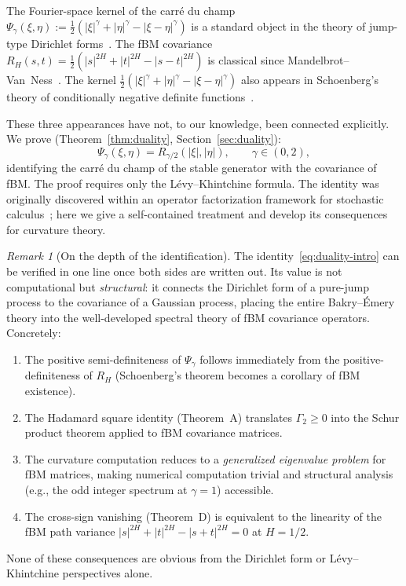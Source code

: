 \documentclass[11pt,a4paper]{article}
\theoremstyle{plain}
\theoremstyle{definition}
\theoremstyle{remark}
\newtheorem{remark}[theorem]{Remark}
\begin{document}
The Fourier-space kernel of the carr\'e du champ
$\Psi_\gamma(\xi,\eta) :=
\frac{1}{2}(|\xi|^\gamma + |\eta|^\gamma - |\xi-\eta|^\gamma)$
is a standard object in the theory of jump-type Dirichlet
forms~\cite{BoettcherSchillingWang2013}.
The fBM covariance $R_H(s,t) = \frac{1}{2}(|s|^{2H} + |t|^{2H}
- |s-t|^{2H})$ is classical since
Mandelbrot--Van~Ness~\cite{Mishura2008}.
The kernel $\frac{1}{2}(|\xi|^\gamma + |\eta|^\gamma
- |\xi-\eta|^\gamma)$ also appears in Schoenberg's
theory of conditionally negative definite
functions~\cite{Schoenberg1938}.

These three appearances have not, to our knowledge, been connected
explicitly.  We prove (Theorem~\ref{thm:duality},
Section~\ref{sec:duality}):
\begin{equation}\label{eq:duality-intro}
  \Psi_\gamma(\xi,\eta) = R_{\gamma/2}(|\xi|,|\eta|),
  \qquad \gamma \in (0,2),
\end{equation}
identifying the carr\'e du champ of the stable generator with
the covariance of fBM.  The proof requires only the
L\'evy--Khintchine formula.
The identity was originally discovered within an operator
factorization framework for stochastic
calculus~\cite{Fontes2026a}; here we give a self-contained
treatment and develop its consequences for curvature theory.

\begin{remark}[On the depth of the identification]
\label{rem:identification}
The identity~\eqref{eq:duality-intro} can be verified
in one line once both sides are written out. Its value
is not computational but \emph{structural}: it connects
the Dirichlet form of a pure-jump process to the
covariance of a Gaussian process, placing the entire
Bakry--\'Emery theory into the well-developed spectral
theory of fBM covariance operators. Concretely:
\begin{enumerate}[label=(\alph*)]
\item The positive semi-definiteness of $\Psi_\gamma$
  follows immediately from the positive-definiteness
  of $R_H$ (Schoenberg's theorem becomes a
  corollary of fBM existence).
\item The Hadamard square identity (Theorem~A)
  translates $\Gamma_2 \geq 0$ into the Schur product
  theorem applied to fBM covariance matrices.
\item The curvature computation reduces to a
  \emph{generalized eigenvalue problem} for fBM
  matrices, making numerical computation trivial
  and structural analysis (e.g., the odd integer
  spectrum at $\gamma = 1$) accessible.
\item The cross-sign vanishing (Theorem~D) is
  equivalent to the linearity of the fBM path
  variance $|s|^{2H} + |t|^{2H} - |s+t|^{2H} = 0$
  at $H = 1/2$.
\end{enumerate}
None of these consequences are obvious from the
Dirichlet form or L\'evy--Khintchine perspectives alone.
\end{remark}
\end{document}
